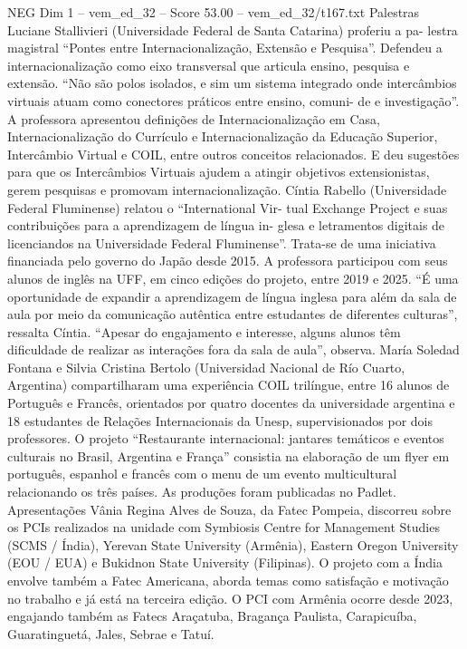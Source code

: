 \begin{textsample}{NEG Dim 1 – vem\_ed\_32 – Score 53.00 – vem\_ed\_32/t167.txt}
Palestras Luciane Stallivieri (Universidade Federal de Santa Catarina) proferiu a pa- lestra magistral “Pontes entre Internacionalização, Extensão e Pesquisa”.
Defendeu a internacionalização como eixo transversal que articula ensino, pesquisa e extensão. “Não são polos isolados, e sim um sistema integrado onde intercâmbios virtuais atuam como conectores práticos entre ensino, comuni- de e investigação”.
A professora apresentou definições de Internacionalização em Casa, Internacionalização do Currículo e Internacionalização da Educação Superior, Intercâmbio Virtual e COIL, entre outros conceitos relacionados.
E deu sugestões para que os Intercâmbios Virtuais ajudem a atingir objetivos extensionistas, gerem pesquisas e promovam internacionalização.
Cíntia Rabello (Universidade Federal Fluminense) relatou o “International Vir- tual Exchange Project e suas contribuições para a aprendizagem de língua in- glesa e letramentos digitais de licenciandos na Universidade Federal Fluminense”.
Trata-se de uma iniciativa financiada pelo governo do Japão desde 2015.
A professora participou com seus alunos de inglês na UFF, em cinco edições do projeto, entre 2019 e 2025. “É uma oportunidade de expandir a aprendizagem de língua inglesa para além da sala de aula por meio da comunicação autêntica entre estudantes de diferentes culturas”, ressalta Cíntia. “Apesar do engajamento e interesse, alguns alunos têm dificuldade de realizar as interações fora da sala de aula”, observa.
María Soledad Fontana e Silvia Cristina Bertolo (Universidad Nacional de Río Cuarto, Argentina) compartilharam uma experiência COIL trilíngue, entre 16 alunos de Português e Francês, orientados por quatro docentes da universidade argentina e 18 estudantes de Relações Internacionais da Unesp, supervisionados por dois professores.
O projeto “Restaurante internacional: jantares temáticos e eventos culturais no Brasil, Argentina e França” consistia na elaboração de um flyer em português, espanhol e francês com o menu de um evento multicultural relacionando os três países.
As produções foram publicadas no Padlet.
Apresentações Vânia Regina Alves de Souza, da Fatec Pompeia, discorreu sobre os PCIs realizados na unidade com Symbiosis Centre for Management Studies (SCMS / Índia), Yerevan State University (Armênia), Eastern Oregon University (EOU / EUA) e Bukidnon State University (Filipinas).
O projeto com a Índia envolve também a Fatec Americana, aborda temas como satisfação e motivação no trabalho e já está na terceira edição.
O PCI com Armênia ocorre desde 2023, engajando também as Fatecs Araçatuba, Bragança Paulista, Carapicuíba, Guaratinguetá, Jales, Sebrae e Tatuí.

\end{textsample}
